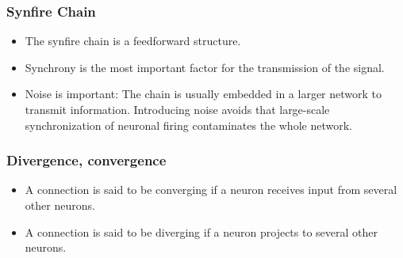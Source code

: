 \documentclass[main]{subfiles}
\begin{document}
\subsubsection{Synfire Chain}
\begin{itemize}[noitemsep,nolistsep]
	\item The synfire chain is a feedforward structure.
	\item Synchrony is the most important factor for the transmission of the signal.
	\item Noise is important: The chain is usually embedded in a larger network to transmit information. Introducing noise avoids that large-scale synchronization of neuronal firing contaminates the whole network.
\end{itemize}

\subsubsection{Divergence, convergence}
\begin{itemize}[noitemsep,nolistsep]
	\item A connection is said to be converging if a neuron receives input from several other neurons.
	\item A connection is said to be diverging if a neuron projects to several other neurons.
\end{itemize}
\end{document}
